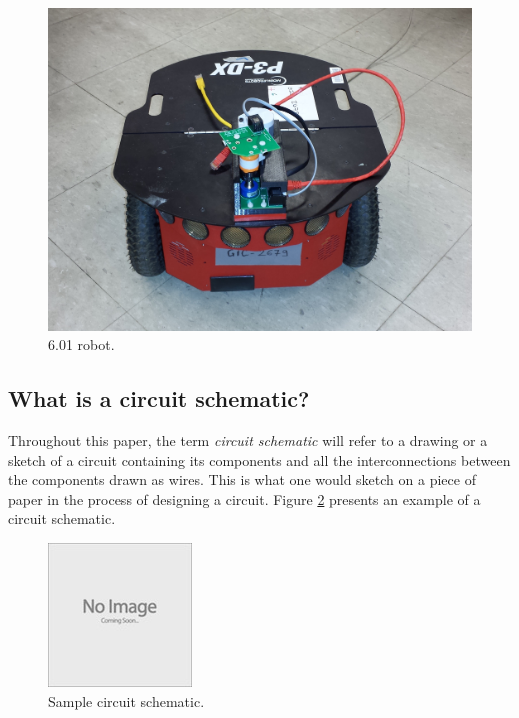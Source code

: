 \begin{figure}
\begin{center}
\includegraphics[width=\textwidth]{Images/robot.jpeg}
\caption{6.01 robot.}
\label{fig:robot}
\end{center}
\end{figure}

\subsection{What is a circuit schematic?}

Throughout this paper, the term \textit{circuit schematic} will refer to a
drawing or a sketch of a circuit containing its components and all the
interconnections between the components drawn as wires. This is what one would
sketch on a piece of paper in the process of designing a circuit. Figure
\ref{fig:schematic} presents an example of a circuit schematic.

\begin{figure}
\begin{center}
\includegraphics{Images/placeholder.jpg}
\caption{Sample circuit schematic.}
\label{fig:schematic}
\end{center}
\end{figure}

